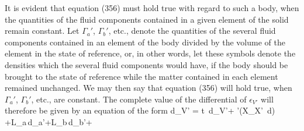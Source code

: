 \documentclass[12pt]{memoir}
\begin{document}
{It is evident that equation (356) must hold true with regard to such a body, when the quantities of the fluid components contained in a given element of the solid remain constant. Let $\Gamma_a'$, $\Gamma_b'$, etc., denote the quantities of the several fluid components contained in an element of the body divided by the volume of the element in the state of reference, or, in other words, let these symbols denote the densities which the several fluid components would have, if the body should be brought to the state of reference while the matter contained in each element remained unchanged. We may then say that equation (356) will hold true, when $\Gamma_a'$, $\Gamma_b'$, etc., are constant. The complete value of the differential of $\epsilon_{V'}$ will therefore be given by an equation of the form
\eqs d\epsilon_{V'} = t \,d\eta_{V'}+  \sum\sum\nolimits'\left(X_{X'} \,d\right) +L_a\,d\Gamma_a'+L_b\,d\Gamma_b'+     \label{462}\eqe


}
\end{document}
